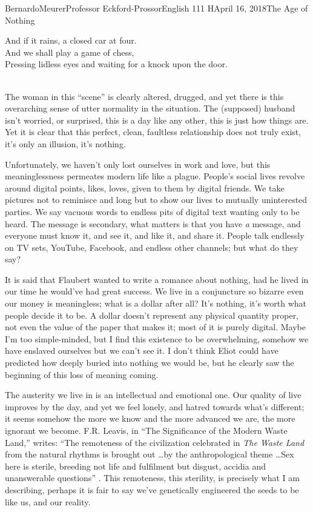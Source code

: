 \documentclass[12pt,letterpaper]{article}
\begin{document}
\begin{mla}{Bernardo}{Meurer}{Professor Eckford-Prossor}{English 111 H}{April 16, 2018}{The Age of Nothing}
\begin{blocks}
        And if it rains, a closed car at four.\\
        And we shall play a game of chess,\\
        Pressing lidless eyes and waiting for a knock upon the door.\\
        \autocite[9]{eliot_2001}~\phantom{''~''~''~''~''}%
    \end{blocks}
    The woman in this ``scene'' is clearly altered, drugged, and yet there is this overarching sense of utter normality in the situation. The (supposed) husband isn't worried, or surprised, this is a day like any other, this is just how things are. Yet it is clear that this perfect, clean, faultless relationship does not truly exist, it's only an illusion, it's nothing.

    Unfortunately, we haven't only lost ourselves in work and love, but this meaninglessness permeates modern life like a plague. People's social lives revolve around digital points, likes, loves, given to them by digital friends. We take pictures not to reminisce and long but to show our lives to mutually uninterested parties. We say vacuous words to endless pits of digital text wanting only to be heard. The message is secondary, what matters is that you have \textit{a} message, and everyone
    must know it, and see it, and like it, and share it. People talk endlessly on TV sets, YouTube, Facebook, and endless other channels; but what do they say?

    It is said that Flaubert wanted to write a romance about nothing, had he lived in our time he would've had great success. We live in a conjuncture so bizarre even our money is meaningless; what is a dollar after all? It's nothing, it's worth what people decide it to be. A dollar doesn't represent any physical quantity proper, not even the value of the paper that makes it; most of it is purely digital. Maybe I'm too simple-minded, but I find this existence to be overwhelming, somehow we have
    enslaved ourselves but we can't see it. I don't think Eliot could have predicted how deeply buried into nothing we would be, but he clearly saw the beginning of this loss of meaning coming.

    The austerity we live in is an intellectual and emotional one. Our quality of live improves by the day, and yet we feel lonely, and hatred towards what's different; it seems somehow the more we know and the more advanced we are, the more ignorant we become.
    F.R. Leavis, in ``The Significance of the Modern Waste Land,'' writes: ``The remoteness of the civilization celebrated in \emph{The Waste Land} from the natural rhythms is brought out \ldots by the anthropological theme \ldots Sex here is sterile, breeding not life and fulfilment but disgust, accidia and unanswerable questions'' \autocite[Eliot 174]{eliot_2001}.
    This remoteness, this sterility, is precisely what I am describing, perhaps it is fair to say we've genetically engineered the seeds to be like us, and our reality.


\end{mla}
\end{document}
